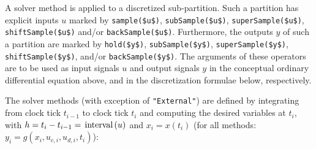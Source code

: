 A solver method is applied to a discretized sub-partition.
Such a partition has explicit inputs $u$ marked by \lstinline!sample($u$)!, \lstinline!subSample($u$)!, \lstinline!superSample($u$)!, \lstinline!shiftSample($u$)! and/or \lstinline!backSample($u$)!.
Furthermore, the outputs $y$ of such a partition are marked by \lstinline!hold($y$)!, \lstinline!subSample($y$)!, \lstinline!superSample($y$)!, \lstinline!shiftSample($y$)!, and/or \lstinline!backSample($y$)!.
The arguments of these operators are to be used as input signals $u$ and output signals $y$ in the conceptual ordinary differential equation above, and in the discretization formulae below, respectively.

The solver methods (with exception of \lstinline!"External"!) are defined by integrating from clock tick $t_{i-1}$ to clock tick
$t_{i}$ and computing the desired variables at $t_{i}$, with $h = t_{i} - t_{i-1} = \text{\lstinline!interval!}(u)$ and $x_{i} = x(t_{i})$ (for all methods: $y_i = g(x_i,u_{c,i},u_{d,i},t_i)$):
